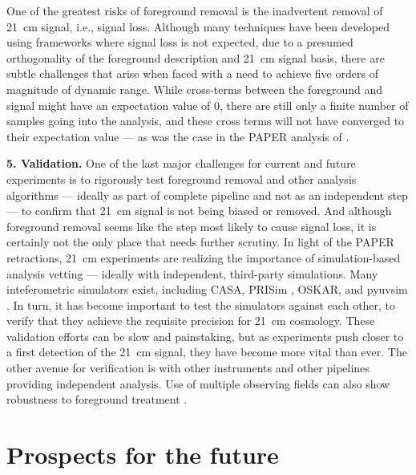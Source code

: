 One of the greatest risks of foreground removal is the inadvertent removal of 21~cm signal, i.e., signal loss.  Although many techniques have been developed using frameworks where signal loss is not expected, due to a presumed orthogonality of the foreground description and 21~cm signal basis, there are subtle challenges that arise when faced with a need to achieve five orders of magnitude of dynamic range.  While cross-terms between the foreground and signal might have an expectation value of 0, there are still only a finite number of samples going into the analysis, and these cross terms will not have converged to their expectation value --- as was the case in the PAPER analysis of \cite{ali15}.  

\textbf{5. Validation.} One of the last major challenges for current and future experiments is to rigorously test foreground removal and other analysis algorithms --- ideally as part of complete pipeline and not as an independent step --- to confirm that 21~cm signal is not being biased or removed.  And although foreground removal seems like the step most likely to cause signal loss, it is certainly not the only place that needs further scrutiny.  In light of the PAPER retractions, 21~cm experiments are realizing the importance of simulation-based analysis vetting --- ideally with independent, third-party simulations.  Many inteferometric simulators exist, including CASA, PRISim \cite{thyagarajan15a}, OSKAR, and pyuvsim \cite{lanman19}.  In turn, it has become important to test the simulators against each other, to verify that they achieve the requisite precision for 21~cm cosmology.  These validation efforts can be slow and painstaking, but as experiments push closer to a first detection of the 21~cm signal, they have become more vital than ever. The other avenue for verification is with other instruments and other pipelines providing independent analysis. Use of multiple observing fields can also show robustness to foreground treatment \cite{trott19_kde}.

\section{Prospects for the future}
\label{sec:prospects}

